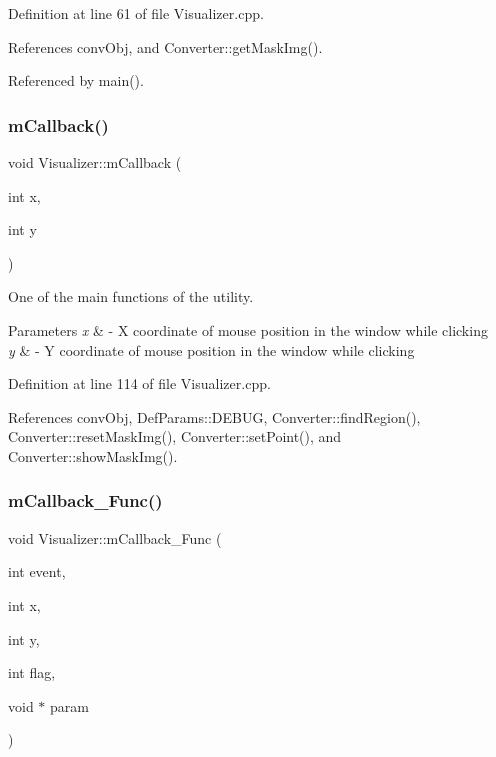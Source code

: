 Definition at line 61 of file Visualizer.\+cpp.



References conv\+Obj, and Converter\+::get\+Mask\+Img().



Referenced by main().

\mbox{\label{class_visualizer_a3fc264f00e663adfcf5abe46bc72933b}} 
\subsubsection{\texorpdfstring{mCallback()}{mCallback()}}
{\footnotesize\ttfamily void Visualizer\+::m\+Callback (\begin{DoxyParamCaption}\item[{int}]{x,  }\item[{int}]{y }\end{DoxyParamCaption})}



One of the main functions of the utility. 


\begin{DoxyParams}{Parameters}
{\em x} & -\/ X coordinate of mouse position in the window while clicking \\
\hline
{\em y} & -\/ Y coordinate of mouse position in the window while clicking \\
\hline
\end{DoxyParams}


Definition at line 114 of file Visualizer.\+cpp.



References conv\+Obj, Def\+Params\+::\+D\+E\+B\+UG, Converter\+::find\+Region(), Converter\+::reset\+Mask\+Img(), Converter\+::set\+Point(), and Converter\+::show\+Mask\+Img().

\mbox{\label{class_visualizer_a747f6b8f8d114aa96672220c8f3d8c5d}} 
\subsubsection{\texorpdfstring{mCallback\_Func()}{mCallback\_Func()}}
{\footnotesize\ttfamily void Visualizer\+::m\+Callback\+\_\+\+Func (\begin{DoxyParamCaption}\item[{int}]{event,  }\item[{int}]{x,  }\item[{int}]{y,  }\item[{int}]{flag,  }\item[{void $\ast$}]{param }\end{DoxyParamCaption})\hspace{0.3cm}{\ttfamily [static]}}



